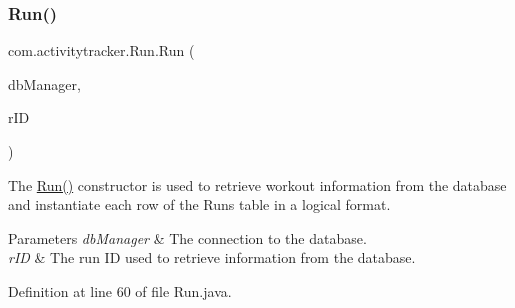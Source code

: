 \subsubsection{\texorpdfstring{Run()}{Run()}}
{\footnotesize\ttfamily com.\+activitytracker.\+Run.\+Run (\begin{DoxyParamCaption}\item[{final \mbox{\hyperlink{classcom_1_1activitytracker_1_1_d_b_manager}{D\+B\+Manager}}}]{db\+Manager,  }\item[{final int}]{r\+ID }\end{DoxyParamCaption})\hspace{0.3cm}{\ttfamily [package]}}

The \mbox{\hyperlink{classcom_1_1activitytracker_1_1_run_a5568c1c514835056d2abc22cfba222c5}{Run()}} constructor is used to retrieve workout information from the database and instantiate each row of the Runs table in a logical format.


\begin{DoxyParams}{Parameters}
{\em db\+Manager} & The connection to the database. \\
\hline
{\em r\+ID} & The run ID used to retrieve information from the database. \\
\hline
\end{DoxyParams}


Definition at line 60 of file Run.\+java.


